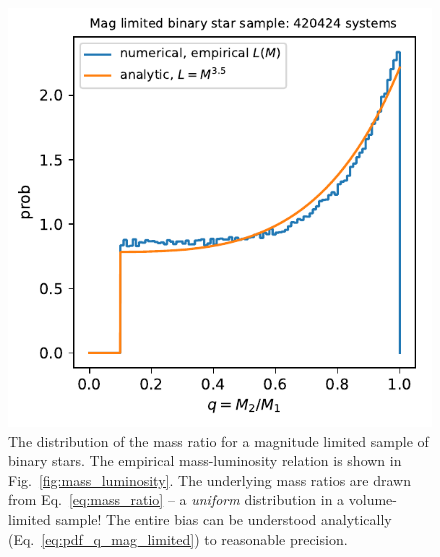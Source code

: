 \documentclass{emulateapj}
\begin{document}
\begin{figure}[!t]
	\begin{center}
		\includegraphics[scale=.8]{figures/q_distribn_mag_limited.pdf}
	\end{center}
	\caption{The distribution of the mass ratio for a magnitude limited 
		sample of binary stars. The empirical mass-luminosity relation is shown
		in Fig.~\ref{fig:mass_luminosity}.
		The underlying mass ratios are drawn from Eq.~\ref{eq:mass_ratio} -- a 
		\textit{uniform} distribution in a volume-limited sample!
		The entire bias can be understood analytically 
		(Eq.~\ref{eq:pdf_q_mag_limited}) to reasonable precision. 
	}
	\label{fig:q_distribn_mag_limited}
\end{figure}
\end{document}
